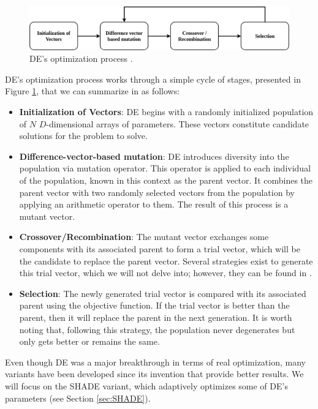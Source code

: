 \documentclass[review]{elsarticle}
\begin{document}
\begin{figure}[!h]
	\centering
	\includegraphics[scale=0.3]{Figures/DEop.png}
	\caption{DE's optimization process \cite{das2011differential}.}\label{img:DE}
\end{figure}

DE's optimization process works through a simple cycle of stages, presented in Figure \ref{img:DE}, that we can summarize in as follows:

\begin{itemize}
	
	\item \textbf{Initialization of Vectors}: DE begins with a randomly initialized population of $N$ $D$-dimensional arrays of parameters. These vectors constitute candidate solutions for the problem to solve.
	
	\item \textbf{Difference-vector-based mutation}: DE introduces diversity into the population via mutation operator. This operator is applied to each individual of the population, known in this context as the parent vector. It combines the parent vector with two randomly selected vectors from the population by applying an arithmetic operator to them. The result of this process is a mutant vector.
	
	\item \textbf{Crossover/Recombination}: The mutant vector exchanges some components with its associated parent to form a trial vector, which will be the candidate to replace the parent vector. Several strategies exist to generate this trial vector, which we will not delve into; however, they can be found in \cite{das2011differential}.
	
	\item \textbf{Selection}: The newly generated trial vector is compared with its associated parent using the objective function. If the trial vector is better than the parent, then it will replace the parent in the next generation. It is worth noting that, following this strategy, the population never degenerates but only gets better or remains the same.
	
\end{itemize}

Even though DE was a major breakthrough in terms of real optimization, many variants have been developed since its invention that provide better results. We will focus on the SHADE variant, which adaptively optimizes some of DE's parameters (see Section \ref{sec:SHADE}).
\end{document}
